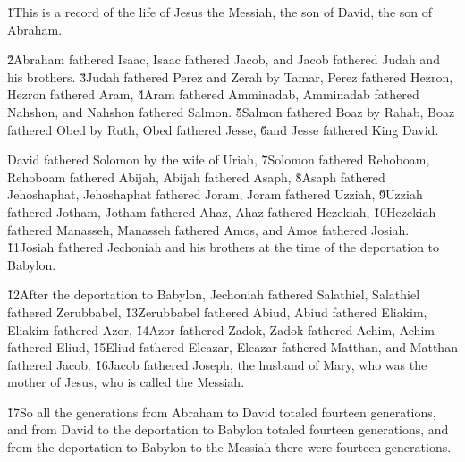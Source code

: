 


\v{1}This is a record of the life of Jesus the Messiah, the son of David, the son of Abraham.

\v{2}Abraham fathered Isaac, Isaac fathered Jacob, and Jacob fathered Judah and his brothers. \v{3}Judah fathered Perez and Zerah by Tamar, Perez fathered Hezron, Hezron fathered Aram, \v{4}Aram fathered Amminadab, Amminadab fathered Nahshon, and Nahshon fathered Salmon. \v{5}Salmon fathered Boaz by Rahab, Boaz fathered Obed by Ruth, Obed fathered Jesse, \v{6}and Jesse fathered King David.

David fathered Solomon by the wife of Uriah, \v{7}Solomon fathered Rehoboam, Rehoboam fathered Abijah, Abijah fathered Asaph, \v{8}Asaph fathered Jehoshaphat, Jehoshaphat fathered Joram, Joram fathered Uzziah, \v{9}Uzziah fathered Jotham, Jotham fathered Ahaz, Ahaz fathered Hezekiah, \v{10}Hezekiah fathered Manasseh, Manasseh fathered Amos, and Amos fathered Josiah. \v{11}Josiah fathered Jechoniah and his brothers at the time of the deportation to Babylon.

\v{12}After the deportation to Babylon, Jechoniah fathered Salathiel, Salathiel fathered Zerubbabel, \v{13}Zerubbabel fathered Abiud, Abiud fathered Eliakim, Eliakim fathered Azor, \v{14}Azor fathered Zadok, Zadok fathered Achim, Achim fathered Eliud, \v{15}Eliud fathered Eleazar, Eleazar fathered Matthan, and Matthan fathered Jacob. \v{16}Jacob fathered Joseph, the husband of Mary, who was the mother of Jesus, who is called the Messiah.

\v{17}So all the generations from Abraham to David totaled fourteen generations, and from David to the deportation to Babylon totaled fourteen generations, and from the deportation to Babylon to the Messiah there were fourteen generations.

